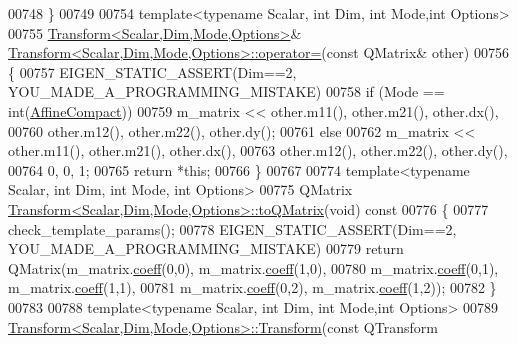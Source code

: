 \begin{DoxyCode}
00748 \}
00749 
00754 \textcolor{keyword}{template}<\textcolor{keyword}{typename} Scalar, \textcolor{keywordtype}{int} Dim, \textcolor{keywordtype}{int} Mode,\textcolor{keywordtype}{int} Options>
00755 \hyperlink{group___geometry___module_class_eigen_1_1_transform}{Transform<Scalar,Dim,Mode,Options>}& 
      \hyperlink{group___geometry___module_class_eigen_1_1_transform}{Transform<Scalar,Dim,Mode,Options>::operator=}(\textcolor{keyword}{const} QMatrix& 
      other)
00756 \{
00757   EIGEN\_STATIC\_ASSERT(Dim==2, YOU\_MADE\_A\_PROGRAMMING\_MISTAKE)
00758   \textcolor{keywordflow}{if} (Mode == \textcolor{keywordtype}{int}(\hyperlink{group__enums_ggaee59a86102f150923b0cac6d4ff05107aa30a06b60d218b709020972df47de2b0}{AffineCompact}))
00759     m\_matrix << other.m11(), other.m21(), other.dx(),
00760                 other.m12(), other.m22(), other.dy();
00761   \textcolor{keywordflow}{else}
00762     m\_matrix << other.m11(), other.m21(), other.dx(),
00763                 other.m12(), other.m22(), other.dy(),
00764                 0, 0, 1;
00765   \textcolor{keywordflow}{return} *\textcolor{keyword}{this};
00766 \}
00767 
00774 \textcolor{keyword}{template}<\textcolor{keyword}{typename} Scalar, \textcolor{keywordtype}{int} Dim, \textcolor{keywordtype}{int} Mode, \textcolor{keywordtype}{int} Options>
00775 QMatrix \hyperlink{group___geometry___module_class_eigen_1_1_transform}{Transform<Scalar,Dim,Mode,Options>::toQMatrix}(\textcolor{keywordtype}{void})\textcolor{keyword}{
       const}
00776 \textcolor{keyword}{}\{
00777   check\_template\_params();
00778   EIGEN\_STATIC\_ASSERT(Dim==2, YOU\_MADE\_A\_PROGRAMMING\_MISTAKE)
00779   \textcolor{keywordflow}{return} QMatrix(m\_matrix.\hyperlink{class_eigen_1_1_plain_object_base_afbfc12954f16d21aedb7bd839f64a278}{coeff}(0,0), m\_matrix.\hyperlink{class_eigen_1_1_plain_object_base_afbfc12954f16d21aedb7bd839f64a278}{coeff}(1,0),
00780                  m\_matrix.\hyperlink{class_eigen_1_1_plain_object_base_afbfc12954f16d21aedb7bd839f64a278}{coeff}(0,1), m\_matrix.\hyperlink{class_eigen_1_1_plain_object_base_afbfc12954f16d21aedb7bd839f64a278}{coeff}(1,1),
00781                  m\_matrix.\hyperlink{class_eigen_1_1_plain_object_base_afbfc12954f16d21aedb7bd839f64a278}{coeff}(0,2), m\_matrix.\hyperlink{class_eigen_1_1_plain_object_base_afbfc12954f16d21aedb7bd839f64a278}{coeff}(1,2));
00782 \}
00783 
00788 \textcolor{keyword}{template}<\textcolor{keyword}{typename} Scalar, \textcolor{keywordtype}{int} Dim, \textcolor{keywordtype}{int} Mode,\textcolor{keywordtype}{int} Options>
00789 \hyperlink{group___geometry___module_a79b94ccee0f7871610fa2fa084e0fd59}{Transform<Scalar,Dim,Mode,Options>::Transform}(\textcolor{keyword}{const} QTransform

\end{DoxyCode}

